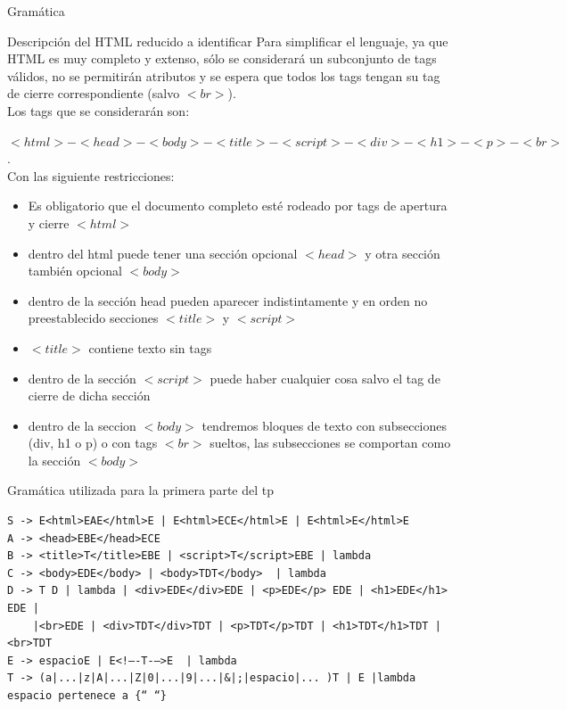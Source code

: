 \documentclass[a4paper,8pt]{article}
\begin{document}
\begin{section}{Gramática}
\begin{subsection}{Descripción del HTML reducido a identificar}
Para simplificar el lenguaje, ya que HTML es muy completo y extenso, sólo se considerará un subconjunto de tags válidos, no se permitirán atributos y se espera que todos los tags tengan su tag de cierre correspondiente (salvo $<br>$).\\


Los tags que se considerarán son:

\textbf{$<html>-<head>-<body>-<title>-<script>-<div>-<h1>-<p>-<br>$}.\\

Con las siguiente restricciones:

\begin{itemize}
 \item Es obligatorio que el documento completo esté rodeado por tags de apertura y cierre $<html>$
\item dentro del html puede tener una sección opcional $<head>$ y otra sección también opcional $<body>$
\item dentro de la sección head pueden aparecer indistintamente y en orden no preestablecido secciones $<title>$ y $<script>$
\item $<title>$ contiene texto sin tags
\item dentro de la sección $<script>$ puede haber cualquier cosa salvo el tag de cierre de dicha sección
\item dentro de la seccion $<body>$ tendremos bloques de texto con subsecciones (div, h1 o p) o con tags $<br>$ sueltos, las subsecciones se comportan como la sección $<body>$
\end{itemize}


\end{subsection}

\begin{subsection}{Gramática utilizada para la primera parte del tp}
\bigskip

\begin{verbatim}
S -> E<html>EAE</html>E | E<html>ECE</html>E | E<html>E</html>E
A -> <head>EBE</head>ECE
B -> <title>T</title>EBE | <script>T</script>EBE | lambda
C -> <body>EDE</body> | <body>TDT</body>  | lambda
D -> T D | lambda | <div>EDE</div>EDE | <p>EDE</p> EDE | <h1>EDE</h1> EDE |
    |<br>EDE | <div>TDT</div>TDT | <p>TDT</p>TDT | <h1>TDT</h1>TDT | <br>TDT
E -> espacioE | E<!–-T-–>E  | lambda 
T -> (a|...|z|A|...|Z|0|...|9|...|&|;|espacio|... )T | E |lambda  
espacio pertenece a {“ “}


\end{verbatim}
\end{subsection}
\end{section}
\end{document}
